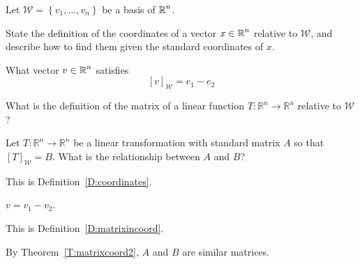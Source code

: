 \documentclass{ximera}
\author{Matthew Carr \& Marty Golubitsky}
\begin{document}
\begin{exercise}\label{mc.exerciseErr4}




Let $\mathcal{W}=\left\{v_1,\ldots ,v_n\right\}$ be a basis of $\mbox{$\mathbb{R}$}^n$.
\begin{enumeratea}%
\item State the definition of the coordinates of a vector $x \in\mbox{$\mathbb{R}$}^n$ relative to $\mathcal{W}$, and describe how to find them given the standard coordinates of $x$.
\item What vector $v\in \mbox{$\mathbb{R}$}^n$ satisfies
\[
[v]_{\mathcal{W}}= e_1 - e_2
\]
\item What is the definition of the matrix of a linear function $T:\mathbb{R}^n\rightarrow\mathbb{R}^n$ relative to $\mathcal{W}$?
\item Let $T:\mathbb{R}^n\rightarrow\mathbb{R}^n$ be a linear transformation with standard matrix $A$ so that $[T]_{\mathcal{W}}=B$. What is the relationship between $A$ and $B$?
\end{enumeratea}


\begin{solution}
\ans
\begin{enumeratea}%
\item This is Definition~\ref{D:coordinates}. 
\item $v = v_1 - v_2$.
\item This is Definition~\ref{D:matrixincoord}.
\item By Theorem~\ref{T:matrixcoord2},  $A$ and $B$ are similar matrices. 
\end{enumeratea}
\end{solution}
\end{exercise}
\end{document}

